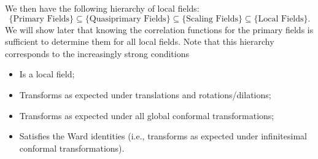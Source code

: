 \documentclass[fleqn]{NotesClass}
\begin{document}
    We then have the following hierarchy of local fields:
    \begin{equation*}
        \{\text{Primary Fields}\} \subseteq \{\text{Quasiprimary Fields}\} \subseteq \{\text{Scaling Fields}\} \subseteq \{\text{Local Fields}\}.
    \end{equation*}
    We will show later that knowing the correlation functions for the primary fields is sufficient to determine them for all local fields.
    Note that this hierarchy corresponds to the increasingly strong conditions
    \begin{itemize}
        \item Is a local field;
        \item Transforms as expected under translations and rotations/dilations;
        \item Transforms as expected under all global conformal transformations;
        \item Satisfies the Ward identities (i.e., transforms as expected under infinitesimal conformal transformations).
    \end{itemize}
    
\end{document}
